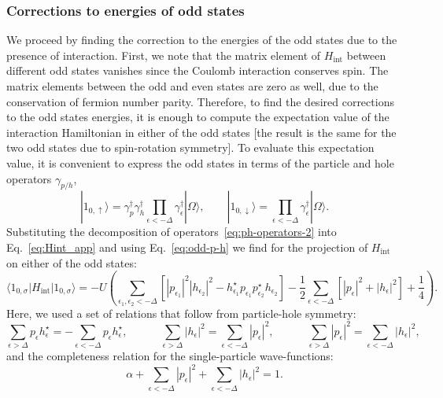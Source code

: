 \documentclass[aps,reprint,longbibliography, prb]{revtex4-2}
\begin{document}
\subsubsection*{Corrections to energies of odd states}
We proceed by finding the correction to the energies of the odd states due to the presence of interaction. First, we note that the matrix element of $H_\mathrm{int}$ between different odd states vanishes since the Coulomb interaction conserves spin. The matrix elements between the odd and even states are zero as well, due to the conservation of fermion number parity. Therefore, to find the desired corrections to the odd states energies, it is enough to compute the expectation value of the interaction Hamiltonian in either of the odd states [the result is the same for the two odd states due to spin-rotation symmetry]. To evaluate this expectation value, it is convenient to express the odd states in terms of the particle and hole operators $\gamma_{p/h}$,
\begin{equation}
\label{eq:odd-p-h}
|1_{0,\uparrow}\rangle=\gamma_{p}^{\dagger}\gamma_{h}^{\dagger}\prod_{\epsilon<-\Delta} \gamma_\epsilon^\dagger  |\Omega\rangle,\quad\quad |1_{0,\downarrow}\rangle=\prod_{\epsilon<-\Delta} \gamma_\epsilon^\dagger  |\Omega\rangle.
\end{equation}
Substituting the decomposition of operators~\eqref{eq:ph-operators-2} into Eq.~\eqref{eq:Hint_app} and using Eq.~\eqref{eq:odd-p-h} we find for the projection of $H_\mathrm{int}$ on either of the odd states:
\begin{equation}
\label{eq:odd-state-correction}
\langle 1_{0,\sigma}|H_\mathrm{int}| 1_{0,\sigma} \rangle = - U\left( \sum_{\epsilon_{1},\epsilon_2<-\Delta}\left[|p_{\epsilon_{1}}|^2|h_{\epsilon_{2}}|^2
-h_{\epsilon_1}^{\star}p_{\epsilon_1}p_{\epsilon_2}^{\star}h_{\epsilon_2}\right]
-\frac{1}{2}\sum_{\epsilon<-\Delta}\left[|p_{\epsilon}|^2+|h_{\epsilon}|^2\right]
+\frac{1}{4}\right).
\end{equation}
Here, we used a set of relations that follow from particle-hole symmetry:
\begin{equation}
    \sum_{\epsilon>\Delta}p_{\epsilon}h_{\epsilon}^{\star} = -\sum_{\epsilon<-\Delta}p_{\epsilon}h_\epsilon^{\star},\quad\quad\quad \sum_{\epsilon>\Delta}|h_\epsilon|^2 = \sum_{\epsilon < -\Delta}|p_\epsilon|^2,\quad\quad\quad \sum_{\epsilon>\Delta}|p_\epsilon|^2 = \sum_{\epsilon < -\Delta} |h_\epsilon|^2,
\end{equation}
and the completeness relation for the single-particle wave-functions:
\begin{equation}\label{eq:compl_app}
\alpha+\sum_{\epsilon<-\Delta}|p_{\epsilon}|^2+\sum_{\epsilon<-\Delta}|h_{\epsilon}|^2=1.
\end{equation}
\end{document}

